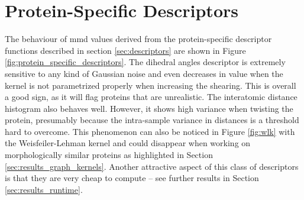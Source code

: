 \section{Protein-Specific Descriptors}\label{sec:results_protein_descriptors}

The behaviour of \acrshort{mmd} values derived from the protein-specific descriptor
functions described in section \ref{sec:descriptors} are shown in Figure
\ref{fig:protein_specific_descriptors}. The dihedral angles descriptor is
extremely sensitive to any kind of Gaussian noise and even decreases in value
when the kernel is not parametrized properly when increasing the shearing. This
is overall a good sign, as it will flag proteins that are unrealistic. The
interatomic distance histogram also behaves well. However, it shows high
variance when twisting the protein, presumably because the intra-sample variance
in distances is a threshold hard to overcome. This phenomenon can also be
noticed in Figure \ref{fig:wlk} with the Weisfeiler-Lehman kernel and could
disappear when working on morphologically similar proteins as highlighted in
Section \ref{sec:results_graph_kernels}. Another attractive aspect of this class
of descriptors is that they are very cheap to compute -- see further results in
Section \ref{sec:results_runtime}.

